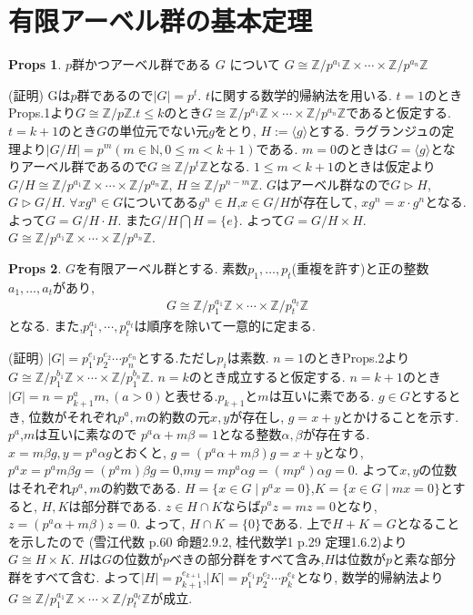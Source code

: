 \documentclass[dvipdfmx]{jsarticle}
\theoremstyle{definition}
\newtheorem{props}{Props}
\numberwithin{equation}{section}
\numberwithin{props}{section}
\numberwithin{definition}{section}
\numberwithin{note}{section}
\newcommand{\ZZ}{\mathbb{Z}}
\newcommand{\NN}{\mathbb{N}}
\begin{document}
\section{有限アーベル群の基本定理}
\begin{props}
     $p$群かつアーベル群である $G$ について $G\cong\ZZ/p^{a_1}\ZZ\times\cdots\times\ZZ/p^{a_n}\ZZ$
\end{props}
(証明) Gは$p$群であるので$\lvert G\rvert = p^t$. $t$に関する数学的帰納法を用いる.  $t=1$のときProps.1より$G\cong\ZZ/p\ZZ$.$t\leq k$のとき$G\cong\ZZ/p^{a_1}\ZZ\times\cdots\times\ZZ/p^{a_n}\ZZ$であると仮定する.
$t=k+1$のとき$G$の単位元でない元$g$をとり, $H:=\langle g\rangle$とする. ラグランジュの定理より$\lvert G/H\rvert = p^m(m\in \NN,0\leq m<k+1)$である. $m=0$のときは$G=\langle g \rangle$となりアーベル群であるので$G\cong \ZZ/p^t\ZZ$となる. $1\leq m<k+1$のときは仮定より$G/H \cong \ZZ/p^{a_1}\ZZ\times\cdots\times\ZZ/p^{a_n}\ZZ$, $H\cong\ZZ/p^{n-m}\ZZ$. 
$G$はアーベル群なので$G\rhd H$,$G\rhd G/H$. $\forall xg^n \in G$についてある$g^n \in H$,$x\in G/H$が存在して, $xg^n = x\cdot g^n$となる. よって$G= G/H\cdot H$.
また$G/H\bigcap H = \lbrace e\rbrace$. よって$G=G/H\times H$. $G\cong\ZZ/p^{a_1}\ZZ\times\cdots\times\ZZ/p^{a_n}\ZZ$.
\begin{props}
     $G$を有限アーベル群とする. 素数$p_1,\ldots,p_t$(重複を許す)と正の整数$a_1,\ldots,a_t$があり,
     \begin{align}
          G\cong \ZZ/p_1^{a_1}\ZZ\times\cdots\times\ZZ/p_t^{a_t}\ZZ
     \end{align}
     となる. また,$p_1^{a_1},\cdots,p_t^{a_t}$は順序を除いて一意的に定まる.
\end{props}
(証明) 
$\lvert G\rvert =p_1^{e_1}p_2^{e_2}\cdots p_n^{e_n}$とする.ただし$p_i$は素数. $n=1$のときProps.2より$G\cong \ZZ/p_1^{b_1}\ZZ\times\cdots\times\ZZ/p_1^{b_n}\ZZ$. $n=k$のとき成立すると仮定する. $n=k+1$のとき$\lvert G\rvert=n=p_{k+1}^am,(a>0)$と表せる.$p_{k+1}$と$m$は互いに素である. $g\in G$とするとき, 位数がそれぞれ$p^a,m$の約数の元$x,y$が存在し, $g=x+y$とかけることを示す. $p^a$,$m$は互いに素なので $p^a\alpha+m\beta=1$となる整数$\alpha,\beta$が存在する. $x=m\beta g,y=p^a\alpha g$とおくと, $g=(p^a\alpha+m\beta)g=x+y$となり, $p^ax=p^am\beta g= (p^am)\beta g=0$,$my= mp^a\alpha g=(mp^a)\alpha g=0$. よって$x,y$の位数はそれぞれ$p^a,m$の約数である.
$H=\lbrace x\in G\mid p^ax=0\rbrace$,$K=\lbrace x\in G\mid mx=0\rbrace$とすると, $H,K$は部分群である. $z\in H\cap K$ならば$p^a z=mz=0$となり, $z=(p^a\alpha+m\beta)z=0$. よって, $H\cap K=\lbrace 0\rbrace$である. 上で$H+K=G$となることを示したので (雪江代数 p.60 命題2.9.2, 桂代数学1 p.29 定理1.6.2)より$G\cong H\times K$. $H$は$G$の位数が$p$べきの部分群をすべて含み,$H$は位数が$p$と素な部分群をすべて含む. よって$\lvert H\rvert=p_{k+1}^{e_{k+1}}$,$\lvert K\rvert=p_1^{e_1}p_2^{e_2}\cdots p_k^{e_k}$となり, 数学的帰納法より$G\cong \ZZ/p_1^{a_1}\ZZ\times\cdots\times\ZZ/p_t^{a_t}\ZZ$が成立.
\end{document}
